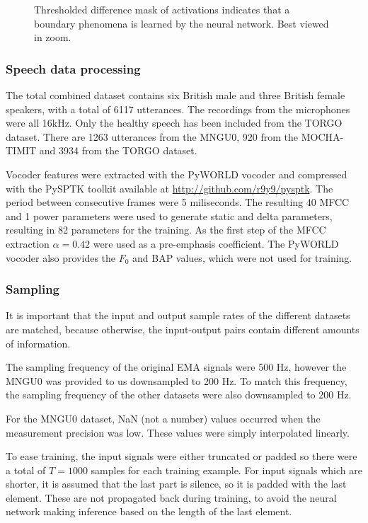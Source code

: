 \documentclass[a4paper]{article}
\begin{document}
\begin{figure}[t]
  \caption{Thresholded difference mask of activations indicates that a boundary phenomena is learned by the neural network. Best viewed in zoom.}
  \label{fig:mask}
  \begin{center}
    \scalebox{0.40}{}
\end{center}
\end{figure}
\subsubsection{Speech data processing}

The total combined dataset contains six British male and three British female speakers, with a total
of 6117 utterances. The recordings from the microphones were all 16kHz. Only the healthy speech has been included from the TORGO dataset. There are 1263 utterances from the MNGU0, 920 from the MOCHA-TIMIT and 3934 from the TORGO dataset.

Vocoder features were extracted with the PyWORLD vocoder \cite{Morise2016}
and compressed with the PySPTK toolkit available at \url{http://github.com/r9y9/pysptk}.
The period between consecutive frames were 5 miliseconds. The resulting 40 MFCC
and 1 power parameters were used to generate static and delta parameters,
resulting in 82 parameters for the training. As the first step of the MFCC extraction \( \alpha
= 0.42 \) were used as a pre-emphasis coefficient. The PyWORLD vocoder
also provides the $ F_0 $ and BAP values, which were not used for training. 

\subsubsection{Sampling}

It is important that the input and output sample rates of the different
datasets are matched, because otherwise, the input-output pairs contain
different amounts of information.  

The sampling frequency of the original EMA signals were 500 Hz, however
the MNGU0 was provided to us downsampled to 200 Hz. To match this frequency,
the sampling frequency of the other datasets were also downsampled to 200 Hz.

For the MNGU0 dataset, NaN (not a number) values occurred when the measurement precision
was low. These values were simply interpolated linearly. 

To ease training, the input signals were either truncated or padded
so there were a total of \( T = 1000 \) samples for each training example.
For input signals which are shorter, it is assumed that the last part is
silence, so it is padded with the last element. These are not propagated back during training, to avoid the neural network making inference based on the length of the last element.
\end{document}
